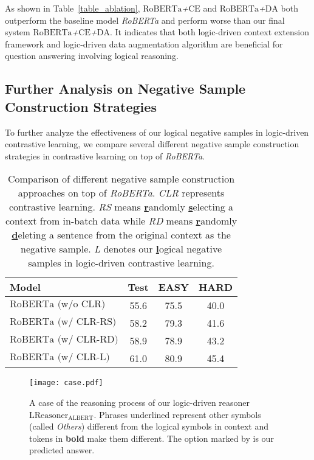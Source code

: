 \documentclass[11pt,a4paper]{article}
\begin{document}
As shown in Table~\ref{table_ablation}, \emph{$\text{RoBERTa}$+$\text{CE}$} and \emph{$\text{RoBERTa}$+$\text{DA}$} both outperform the baseline model \emph{RoBERTa} and perform worse than our final system \emph{$\text{RoBERTa}$+$\text{CE}$+$\text{DA}$}. It indicates that both logic-driven context extension framework and logic-driven data augmentation algorithm are beneficial for question answering involving logical reasoning.

\subsection{Further Analysis on Negative Sample Construction Strategies}
To further analyze the effectiveness of our logical negative samples in logic-driven contrastive learning, we compare several different negative sample construction strategies in contrastive learning on top of \emph{RoBERTa}.
\begin{table}[!th]
    \setlength\tabcolsep{4pt}
    \newcommand{\tabincell}[2]{\begin{tabular}{@{}#1@{}}#2\end{tabular}}
	\centering
	\begin{tabular}{l|ccc}
	\toprule
    \bf Model & \bf Test & \bf EASY & \bf HARD \\
	\midrule
    $\text{RoBERTa (w/o CLR)}$ & 55.6 & 75.5 & 40.0 \\
    $\text{RoBERTa (w/ CLR-RS)}$ & 58.2 & 79.3 & 41.6 \\
    $\text{RoBERTa (w/ CLR-RD)}$ & 58.9 & 78.9 & 43.2 \\
    $\text{RoBERTa (w/ CLR-L)}$ & 61.0 & 80.9 & 45.4 \\
	\bottomrule
 	\end{tabular}
	\caption{Comparison of different negative sample construction approaches on top of \emph{RoBERTa}.
	\emph{CLR} represents contrastive learning. \emph{RS} means \underline{\bf r}andomly \underline{\bf s}electing a context from in-batch data while \emph{RD} means \underline{\bf r}andomly \underline{\bf d}eleting a sentence from the original context as the negative sample. \emph{L} denotes our \underline{\bf l}ogical negative samples in logic-driven contrastive learning.}
	\label{table_logical_negative}
\end{table}

\begin{figure*}[!th]
\centering
\texttt{[image: case.pdf]}
\caption{\label{figure_case} A case of the reasoning process of our logic-driven reasoner \emph{$\text{LReasoner}_{\text{ALBERT}}$}. Phrases underlined represent other symbols (called \emph{Others}) different from the logical symbols in context and tokens in \textbf{bold} make them different. The option marked by \textcolor[RGB]{74,163,87}{\checkmark} is our predicted answer.}
\end{figure*}
\end{document}
